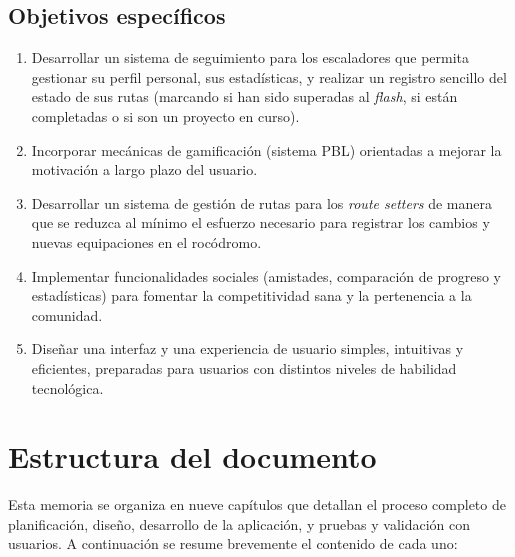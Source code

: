 \subsection{Objetivos específicos}

\begin{enumerate}
	\item Desarrollar un sistema de seguimiento para los escaladores que permita gestionar su perfil personal, sus estadísticas, y realizar un registro sencillo del estado de sus rutas (marcando si han sido superadas al \textit{flash}, si están completadas o si son un proyecto en curso).
	\item Incorporar mecánicas de gamificación (sistema PBL) orientadas a mejorar la motivación a largo plazo del usuario.
	\item Desarrollar un sistema de gestión de rutas para los \textit{route setters} de manera que se reduzca al mínimo el esfuerzo necesario para registrar los cambios y nuevas equipaciones en el rocódromo.
	\item Implementar funcionalidades sociales (amistades, comparación de progreso y estadísticas) para fomentar la competitividad sana y la pertenencia a la comunidad.
	\item Diseñar una interfaz y una experiencia de usuario simples, intuitivas y eficientes, preparadas para usuarios con distintos niveles de habilidad tecnológica.
\end{enumerate}


\section{Estructura del documento}

Esta memoria se organiza en nueve capítulos que detallan el proceso completo de planificación, diseño, desarrollo de la aplicación, y pruebas y validación con usuarios. A continuación se resume brevemente el contenido de cada uno:

